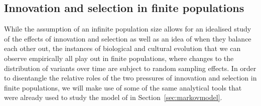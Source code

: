 


\subsection{Innovation and selection in finite populations}

While the assumption of an infinite population size allows for an idealised study of the effects of innovation and selection as well as an idea of when they balance each other out, the instances of biological and cultural evolution that we can observe empirically all play out in finite populations, where changes to the distribution of variants over time are subject to random sampling effects. In order to disentangle the relative roles of the two pressures of innovation and selection in finite populations, we will make use of some of the same analytical tools that were already used to study the model of \citeauthor{Reali2009} in Section~\ref{sec:markovmodel}.

